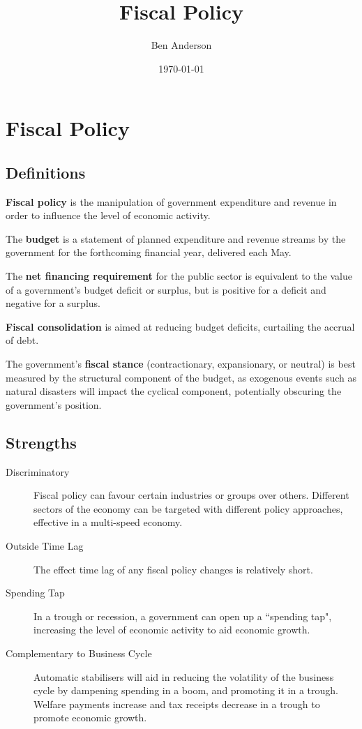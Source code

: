 \documentclass[a4paper,11pt]{article}
\begin{document}
\title{Fiscal Policy}
\author{Ben Anderson}
\date{\today}
\maketitle
\pagebreak

\tableofcontents
\pagebreak


\section{Fiscal Policy}

\subsection{Definitions}

\textbf{Fiscal policy} is the manipulation of government expenditure and
revenue in order to influence the level of economic activity.

The \textbf{budget} is a statement of planned expenditure and revenue streams
by the government for the forthcoming financial year, delivered each May.

The \textbf{net financing requirement} for the public sector is equivalent to
the value of a government's budget deficit or surplus, but is positive for a
deficit and negative for a surplus.

\textbf{Fiscal consolidation} is aimed at reducing budget deficits, curtailing
the accrual of debt.

The government's \textbf{fiscal stance} (contractionary, expansionary, or
neutral) is best measured by the structural component of the budget, as
exogenous events such as natural disasters will impact the cyclical component,
potentially obscuring the government's position.


\subsection{Strengths}

\begin{description}
\item [Discriminatory] Fiscal policy can favour certain industries or groups
	over others. Different sectors of the economy can be targeted with different
	policy approaches, effective in a multi-speed economy.
\item [Outside Time Lag] The effect time lag of any fiscal policy changes
	is relatively short.
\item [Spending Tap] In a trough or recession, a government can open up a
	``spending tap", increasing the level of economic activity to aid economic
	growth.
\item [Complementary to Business Cycle] Automatic stabilisers will aid in
	reducing the volatility of the business cycle by dampening spending in a
	boom, and promoting it in a trough. Welfare payments increase and tax
	receipts decrease in a trough to promote economic growth.
\end{description}
\end{document}
